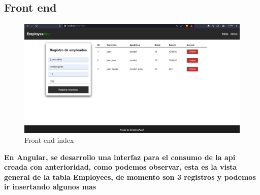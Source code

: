 \documentclass{article}
\begin{document}
    \subsection{Front end}
        \begin{figure}[ht]
            \centering
            \includegraphics[scale=0.3]{img/img8.png}
            \caption{Front end index}
            \label{fig:enter-label}
        \end{figure}
        \textbf{En Angular, se desarrollo una interfaz para el consumo de la api creada con anterioridad, como podemos observar, esta es la vista general de la tabla Employees, de momento son 3 registros y podemos ir insertando algunos mas}
        \newpage
        
\end{document}
